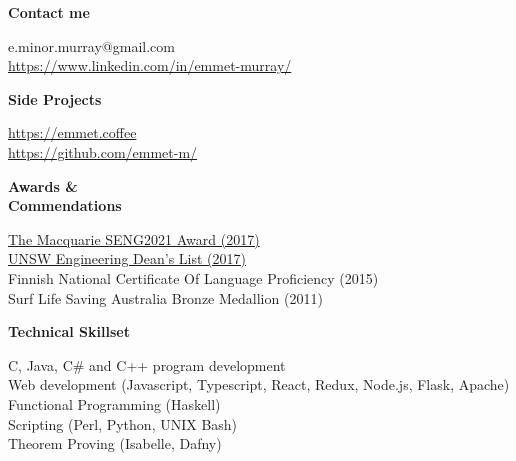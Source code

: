 \documentclass[a4paper]{article}
\newcommand{\mytitle}[1]{{\Large \textbf{#1}} \vspace{0.2cm}}
\begin{document}
\begin{minipage}[t]{0.3\linewidth}
    {
        \mytitle{Contact me}
        
        e.minor.murray@gmail.com \\
        \href{https://www.linkedin.com/in/emmet-murray/}{https://www.linkedin.com/in/emmet-murray/} 

    }
    \vspace{0.5cm}
    {
        \mytitle{Side Projects}
        
        \href{https://emmet.coffee}{https://emmet.coffee} \\
        \href{https://github.com/emmet-m/}{https://github.com/emmet-m/} 
        
    }
    \vspace{0.5cm}

    {
        \mytitle{Awards \&\\ Commendations}

        \href{https://www.engineering.unsw.edu.au/computer-science-engineering/help-resources/for-students/prizes-and-awards/2017-winners}{The Macquarie SENG2021 Award (2017)} \\
        
        \href{https://www.engineering.unsw.edu.au/study-with-us/current-students/academic-information/awards-prizes/dean’s-honours-list/past-winners}{UNSW Engineering Dean's List (2017)} \\
        

        Finnish National Certificate Of Language Proficiency (2015) \\

        Surf Life Saving Australia Bronze Medallion (2011)
    }
    \vspace{0.5cm}
    
    {
        \mytitle{Technical Skillset}

        C, Java, C\# and C++ program development \\ 

        Web development (Javascript, Typescript, React, Redux, Node.js, Flask, Apache) \\

        Functional Programming (Haskell) \\

        Scripting (Perl, Python, UNIX Bash) \\

        Theorem Proving (Isabelle, Dafny) \\

}
\end{minipage}
\end{document}
